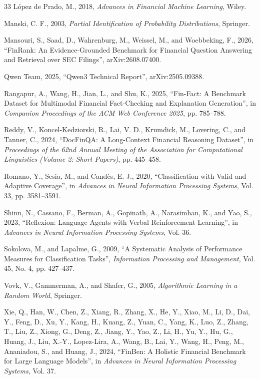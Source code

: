 \begin{thebibliography}{33}
L\'opez de Prado, M., 2018, \emph{Advances in Financial Machine Learning}, Wiley.

Manski, C. F., 2003, \emph{Partial Identification of Probability Distributions}, Springer.

Mansouri, S., Saad, D., Wahrenburg, M., Weissel, M., and Woebbeking, F., 2026, ``FinRank: An Evidence-Grounded Benchmark for Financial Question Answering and Retrieval over SEC Filings'', arXiv:2608.07400.

Qwen Team, 2025, ``Qwen3 Technical Report'', arXiv:2505.09388.

Rangapur, A., Wang, H., Jian, L., and Shu, K., 2025, ``Fin-Fact: A Benchmark Dataset for Multimodal Financial Fact-Checking and Explanation Generation'', in \emph{Companion Proceedings of the ACM Web Conference 2025}, pp. 785--788.

Reddy, V., Koncel-Kedziorski, R., Lai, V. D., Krumdick, M., Lovering, C., and Tanner, C., 2024, ``DocFinQA: A Long-Context Financial Reasoning Dataset'', in \emph{Proceedings of the 62nd Annual Meeting of the Association for Computational Linguistics (Volume 2: Short Papers)}, pp. 445--458.

Romano, Y., Sesia, M., and Cand\`es, E. J., 2020, ``Classification with Valid and Adaptive Coverage'', in \emph{Advances in Neural Information Processing Systems}, Vol. 33, pp. 3581--3591.

Shinn, N., Cassano, F., Berman, A., Gopinath, A., Narasimhan, K., and Yao, S., 2023, ``Reflexion: Language Agents with Verbal Reinforcement Learning'', in \emph{Advances in Neural Information Processing Systems}, Vol. 36.

Sokolova, M., and Lapalme, G., 2009, ``A Systematic Analysis of Performance Measures for Classification Tasks'', \emph{Information Processing and Management}, Vol. 45, No. 4, pp. 427--437.

Vovk, V., Gammerman, A., and Shafer, G., 2005, \emph{Algorithmic Learning in a Random World}, Springer.

Xie, Q., Han, W., Chen, Z., Xiang, R., Zhang, X., He, Y., Xiao, M., Li, D., Dai, Y., Feng, D., Xu, Y., Kang, H., Kuang, Z., Yuan, C., Yang, K., Luo, Z., Zhang, T., Liu, Z., Xiong, G., Deng, Z., Jiang, Y., Yao, Z., Li, H., Yu, Y., Hu, G., Huang, J., Liu, X.-Y., Lopez-Lira, A., Wang, B., Lai, Y., Wang, H., Peng, M., Ananiadou, S., and Huang, J., 2024, ``FinBen: A Holistic Financial Benchmark for Large Language Models'', in \emph{Advances in Neural Information Processing Systems}, Vol. 37.


\end{thebibliography}
